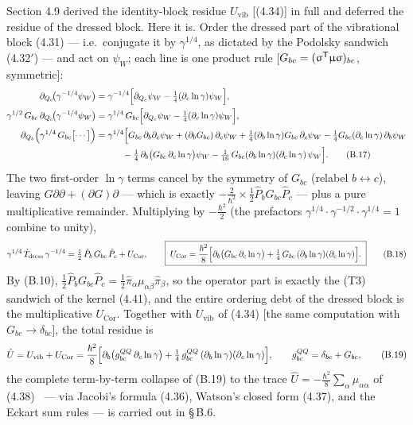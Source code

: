 Section 4.9 derived the identity-block residue $U_{\mathrm{vib}}$ [(4.34)] in full and deferred the residue of the dressed block. Here it is. Order the dressed part of the vibrational block (4.31) --- i.e.\ conjugate it by $\gamma^{1/4}$, as dictated by the Podolsky sandwich (4.32$'$) --- and act on $\psi_W$; each line is one product rule [$G_{bc}=(\upsigma^{\mathsf T}\upmu\upsigma)_{bc}$, symmetric]:
\begin{align}
\partial_{Q_c}\!\bigl(\gamma^{-1/4}\psi_W\bigr)&=\gamma^{-1/4}\Bigl[\partial_{Q_c}\psi_W-\tfrac14(\partial_c\ln\gamma)\psi_W\Bigr],\nonumber\\
\gamma^{1/2}\,G_{bc}\,\partial_{Q_c}\!\bigl(\gamma^{-1/4}\psi_W\bigr)&=\gamma^{1/4}\,G_{bc}\Bigl[\partial_{Q_c}\psi_W-\tfrac14(\partial_c\ln\gamma)\psi_W\Bigr],\nonumber\\
\partial_{Q_b}\Bigl(\gamma^{1/4}\,G_{bc}\bigl[\cdots\bigr]\Bigr)
&=\gamma^{1/4}\Bigl[G_{bc}\,\partial_b\partial_c\psi_W+(\partial_bG_{bc})\,\partial_c\psi_W
+\tfrac14(\partial_b\ln\gamma)G_{bc}\,\partial_c\psi_W-\tfrac14 G_{bc}(\partial_c\ln\gamma)\,\partial_b\psi_W\nonumber\\
&\qquad\quad-\tfrac14\,\partial_b\bigl(G_{bc}\,\partial_c\ln\gamma\bigr)\psi_W
-\tfrac{1}{16}\,G_{bc}(\partial_b\ln\gamma)(\partial_c\ln\gamma)\,\psi_W\Bigr]. \tag{B.17}
\end{align}
The two first-order $\ln\gamma$ terms cancel by the symmetry of $G_{bc}$ (relabel $b\leftrightarrow c$), leaving $G\partial\partial+(\partial G)\partial$ --- which is exactly $-\tfrac{2}{\hbar^2}\times\tfrac12\hat P_bG_{bc}\hat P_c$ --- plus a pure multiplicative remainder. Multiplying by $-\tfrac{\hbar^2}{2}$ (the prefactors $\gamma^{1/4}\cdot\gamma^{-1/2}\cdot\gamma^{1/4}=1$ combine to unity),
\begin{equation}
\gamma^{1/4}\,\hat T_{\mathrm{dress}}\,\gamma^{-1/4}
=\tfrac12\,\hat P_b\,G_{bc}\,\hat P_c+U_{\mathrm{Cor}},\qquad
\boxed{\;U_{\mathrm{Cor}}=\frac{\hbar^{2}}{8}\Bigl[\partial_b\bigl(G_{bc}\,\partial_c\ln\gamma\bigr)+\tfrac14\,G_{bc}\,(\partial_b\ln\gamma)(\partial_c\ln\gamma)\Bigr].\;} \tag{B.18}
\end{equation}
By (B.10), $\tfrac12\hat P_bG_{bc}\hat P_c=\tfrac12\hat\pi_\alpha\mu_{\alpha\beta}\hat\pi_\beta$, so the operator part is exactly the (T3) sandwich of the kernel (4.41), and the entire ordering debt of the dressed block is the multiplicative $U_{\mathrm{Cor}}$. Together with $U_{\mathrm{vib}}$ of (4.34) [the same computation with $G_{bc}\to\delta_{bc}$], the total residue is
\begin{equation}
\hat U=U_{\mathrm{vib}}+U_{\mathrm{Cor}}
=\frac{\hbar^{2}}{8}\Bigl[\partial_b\bigl(g^{QQ}_{bc}\,\partial_c\ln\gamma\bigr)+\tfrac14\,g^{QQ}_{bc}\,(\partial_b\ln\gamma)(\partial_c\ln\gamma)\Bigr],
\qquad g^{QQ}_{bc}=\delta_{bc}+G_{bc}, \tag{B.19}
\end{equation}
the complete term-by-term collapse of (B.19) to the trace $\hat U=-\tfrac{\hbar^2}{8}\sum_\alpha\mu_{\alpha\alpha}$ of (4.38)~\cite{watson1968} --- via Jacobi's formula (4.36), Watson's closed form (4.37), and the Eckart sum rules --- is carried out in \S\,B.6.

